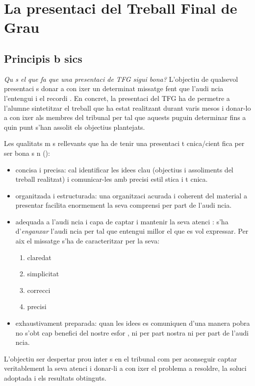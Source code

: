 \chapter{La presentaci  del Treball Final de Grau}\label{presentaci }

\section{Principis b sics}
\emph{Qu   s el que fa que una presentaci  de \ac{TFG} sigui bona?} L'objectiu de qualsevol presentaci   s donar a con ixer un determinat missatge fent que l'audi ncia l'entengui i el recordi \cite{Blair91,Padgett08}. En concret, la presentaci  del \ac{TFG} ha de permetre a l'alumne sintetitzar el treball que ha estat realitzant durant varis mesos i donar-lo a con ixer als membres del tribunal per tal que aquests puguin determinar fins a quin punt s'han assolit els objectius plantejats.

Les qualitats m s rellevants que ha de tenir una presentaci  t cnica/cient fica per ser bona s n (\cite{Blair91,Padgett08,Arcy88,Rice04}):
\begin{itemize}\tightlist
  \item concisa i precisa: cal identificar les idees clau (objectius i assoliments del treball realitzat) i comunicar-les amb precisi  estil stica i t cnica.
  \item organitzada i estructurada: una organitzaci  acurada i coherent del material a presentar facilita enormement la seva comprensi  per part de l'audi ncia.
  \item adequada a l'audi ncia i capa  de captar i mantenir la seva atenci : s'ha d'\emph{enganxar} l'audi ncia per tal que entengui millor el que es vol expressar. Per aix  el missatge s'ha de caracteritzar per la seva:
      \begin{enumerate}\tightlist
        \item claredat
        \item simplicitat
        \item correcci 
        \item precisi 
      \end{enumerate}
  \item exhaustivament preparada: quan les idees es comuniquen d'una manera pobra no s'obt  cap benefici del nostre esfor , ni per part nostra ni per part de l'audi ncia.
\end{itemize}

L'objectiu ser  despertar prou inter s en el tribunal com per aconseguir captar veritablement la seva atenci  i donar-li a con ixer el problema a resoldre, la soluci  adoptada i els resultats obtinguts.

